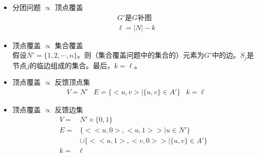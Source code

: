 \documentclass[twocolumn]{article}
\theoremstyle{nonumberplain}%
\begin{document}
\begin{CJK}{UTF8}{gbsn}
\begin{itemize}
    \item 分团问题 $\propto$ 顶点覆盖
        \begin{equation}\nonumber %
        \begin{aligned}
        & G' \text{是}G\text{补图}\\
        & \ell=|N|-k
        \end{aligned}
        \end{equation}

    \item 顶点覆盖 $\propto$ 集合覆盖\\
    
        假设$N'=\{1,2,\cdots,n\}$。则（集合覆盖问题中的集合的）元素为$G'$中的边。$S_j$是节点$j$的临边组成的集合。最后，$k=\ell$。

    \item 顶点覆盖 $\propto$ 反馈顶点集
        \begin{equation}\nonumber %
        \begin{aligned}
        & V=N'
        & E=\{<u,v>|\{u,v\}\in A'\}
        & k=\ell
        \end{aligned}
        \end{equation}

    \item 顶点覆盖 $\propto$ 反馈边集
        \begin{equation}\nonumber %
        \begin{aligned}
        V=&N'\times\{0,1\}\\
        E=&\{<<u,0>,<u,1>>|u\in N'\}\\
          &\cup\{<<u,1>,<v,0>>|\{u,v\}\in A'\}\\
        k=&\ell
        \end{aligned}
        \end{equation}


\end{itemize}
\end{CJK}
\end{document}
